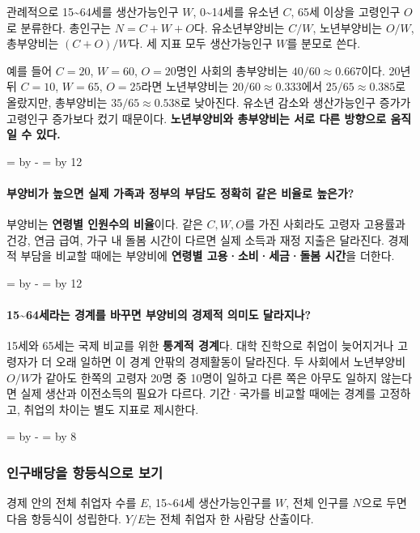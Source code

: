 \documentclass[10pt,a4paper]{article}
\newcommand{\ReserveQuestionSpace}{%
  \par\begingroup
  \dimen0=\pagegoal \advance\dimen0 by -\pagetotal
  \dimen2=\baselineskip \multiply\dimen2 by 12
  \ifdim\dimen0<\dimen2 \newpage\fi
  \endgroup}
\newcommand{\ReserveReadingSectionSpace}{%
  \par\begingroup
  \dimen0=\pagegoal \advance\dimen0 by -\pagetotal
  \dimen2=\baselineskip \multiply\dimen2 by 8
  \ifdim\dimen0<\dimen2 \newpage\fi
  \endgroup}
\begin{document}
관례적으로 15\textasciitilde{}64세를 생산가능인구 $W$, 0\textasciitilde{}14세를 유소년 $C$, 65세 이상을 고령인구 $O$로 분류한다. 총인구는 $N=C+W+O$다. 유소년부양비는 $C/W$, 노년부양비는 $O/W$, 총부양비는 $(C+O)/W$다. 세 지표 모두 생산가능인구 $W$를 분모로 쓴다.\par

예를 들어 $C=20$, $W=60$, $O=20$명인 사회의 총부양비는 $40/60\approx0.667$이다. 20년 뒤 $C=10$, $W=65$, $O=25$라면 노년부양비는 $20/60\approx0.333$에서 $25/65\approx0.385$로 올랐지만, 총부양비는 $35/65\approx0.538$로 낮아진다. 유소년 감소와 생산가능인구 증가가 고령인구 증가보다 컸기 때문이다. \textbf{노년부양비와 총부양비는 서로 다른 방향으로 움직일 수 있다.}\par

\ReserveQuestionSpace
\paragraph{부양비가 높으면 실제 가족과 정부의 부담도 정확히 같은 비율로 높은가?}
부양비는 \textbf{연령별 인원수의 비율}이다. 같은 $C,W,O$를 가진 사회라도 고령자 고용률과 건강, 연금 급여, 가구 내 돌봄 시간이 다르면 실제 소득과 재정 지출은 달라진다. 경제적 부담을 비교할 때에는 부양비에 \textbf{연령별 고용·소비·세금·돌봄 시간}을 더한다.\par

\ReserveQuestionSpace
\paragraph{15\textasciitilde{}64세라는 경계를 바꾸면 부양비의 경제적 의미도 달라지나?}
15세와 65세는 국제 비교를 위한 \textbf{통계적 경계}다. 대학 진학으로 취업이 늦어지거나 고령자가 더 오래 일하면 이 경계 안팎의 경제활동이 달라진다. 두 사회에서 노년부양비 $O/W$가 같아도 한쪽의 고령자 20명 중 10명이 일하고 다른 쪽은 아무도 일하지 않는다면 실제 생산과 이전소득의 필요가 다르다. 기간·국가를 비교할 때에는 경계를 고정하고, 취업의 차이는 별도 지표로 제시한다.\par

\ReserveReadingSectionSpace
\subsubsection*{인구배당을 항등식으로 보기}

경제 안의 전체 취업자 수를 $E$, 15\textasciitilde{}64세 생산가능인구를 $W$, 전체 인구를 $N$으로 두면 다음 항등식이 성립한다. $Y/E$는 전체 취업자 한 사람당 산출이다.\par
\end{document}
